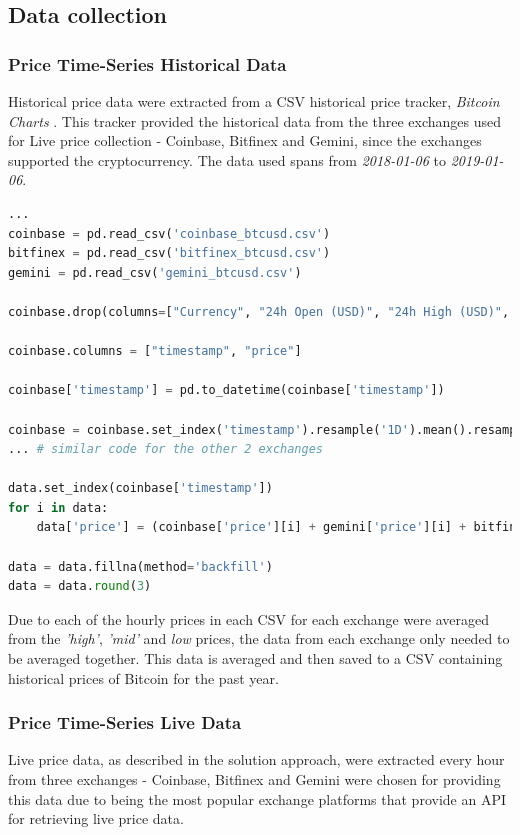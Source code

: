 \documentclass[oneside, 12pt]{article}
\begin{document}
		\subsection{Data collection}\label{collection}
			\subsubsection{Price Time-Series Historical Data}
			Historical price data were extracted from a CSV historical price tracker, \textit{Bitcoin Charts} \cite{37}. This tracker provided the historical data from the three exchanges used for Live price collection - Coinbase, Bitfinex and Gemini, since the exchanges supported the cryptocurrency. The data used spans from \textit{2018-01-06} to \textit{2019-01-06}.
			
			\begin{lstlisting}[language=Python, caption=Historical price collection and averaging per exchange]
...
coinbase = pd.read_csv('coinbase_btcusd.csv')
bitfinex = pd.read_csv('bitfinex_btcusd.csv')
gemini = pd.read_csv('gemini_btcusd.csv')
			
coinbase.drop(columns=["Currency", "24h Open (USD)", "24h High (USD)", "24h Low (USD)"], axis=1, inplace=True)
			
coinbase.columns = ["timestamp", "price"]
			
coinbase['timestamp'] = pd.to_datetime(coinbase['timestamp'])
			
coinbase = coinbase.set_index('timestamp').resample('1D').mean().resample('1H').mean()
... # similar code for the other 2 exchanges
			
data.set_index(coinbase['timestamp'])
for i in data:
	data['price'] = (coinbase['price'][i] + gemini['price'][i] + bitfinex['price'][i])/3
			
data = data.fillna(method='backfill')
data = data.round(3)
			\end{lstlisting}
			
			Due to each of the hourly prices in each CSV for each exchange were averaged from the \textit{'high'}, \textit{'mid'} and \textit{low} prices, the data from each exchange only needed to be averaged together. This data is averaged and then saved to a CSV containing historical prices of Bitcoin for the past year.
			
			\subsubsection{Price Time-Series Live Data}
			Live price data, as described in the solution approach, were extracted every hour from three exchanges - Coinbase, Bitfinex and Gemini were chosen for providing this data due to being the most popular exchange platforms that provide an API for retrieving live price data.
			
\end{document}

